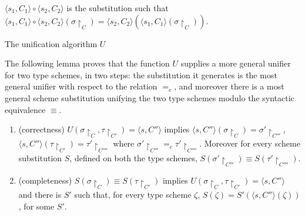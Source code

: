 \begin{table*}
\begin{center}
{\begin{minipage}{.9\textwidth}
\vspace{1mm}  
$\langle s_1,C_{1}\rangle \circ 
  \langle s_2,C_{2}\rangle $ is the substitution such that \\
$\langle s_1,C_{1}\rangle \circ 
  \langle s_2,C_{2}\rangle(\sigma\restriction_{C})=\langle s_2,C_{2}\rangle(\langle s_1,C_{1}\rangle
  (\sigma\restriction_{C}))$.
\end{minipage}}
\end{center}
\caption{The unification algorithm $U$}\label{U-unification}
\end{table*}

The following lemma  proves that the function $U$ supplies a more general unifier for two type schemes,
in two steps: the substitution it generates is the most general unifier with respect to
the relation $=_{e}$, and moreover there is a most general scheme substitution
unifying the two type schemes modulo the syntactic equivalence $\equiv$.

\begin{lem}\label{e-unif}\hfill
\begin{enumerate}[\em i)]
\item (correctness) $U(\sigma\restriction_{C}, \tau\restriction_{C'})=\langle s,C''\rangle $ implies
  $\langle s,C''\rangle(\sigma\restriction_{C})=\sigma'\restriction_{C'''}$,   
  $\langle s,C''\rangle(\tau\restriction_{C'})=\tau'\restriction_{C''''}$ where $\sigma'\restriction_{C'''}=_{e}\tau'\restriction_{C''''}$.
  Moreover for every scheme substitution $S$, defined on both the type schemes,
  $S(\sigma'\restriction_{C'''})\equiv  S(\tau'\restriction_{C''''})$.
\item (completeness) $S(\sigma\restriction_{C})\equiv S(\tau\restriction_{C'})$ implies
  $U(\sigma\restriction_{C},\tau\restriction_{C'})=\langle s,C''\rangle $ 
and  there is $S'$ such that, for every type scheme $\zeta$, 
  $S(\zeta)=S'(\langle s,C''\rangle(\zeta))$, for some $S'$.
\end{enumerate}
\end{lem}

